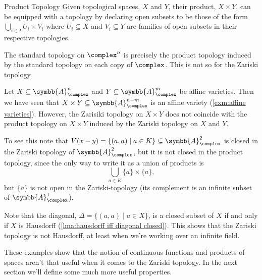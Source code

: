 \documentclass[fleqn]{NotesClass}
\newcommand{\affine}{\symbb{A}}
\begin{document}
    \begin{exm}{Product Topology}{}
        Given topological spaces, \(X\) and \(Y\), their product, \(X \times Y\), can be equipped with a topology by declaring open subsets to be those of the form \(\bigcup_{i \in I} U_i \times V_i\) where \(U_i \subseteq X\) and \(V_i \subseteq Y\) are families of open subsets in their respective topologies.
        
        The standard topology on \(\complex^n\) is precisely the product topology induced by the standard topology on each copy of \(\complex\).
        This is not so for the Zariski topology.
        
        Let \(X \subseteq \affine_{\complex}^n\) and \(Y \subseteq \affine_{\complex}^m\) be affine varieties.
        Then we have seen that \(X \times Y \subseteq \affine_{\complex}^{n+m}\) is an affine variety (\cref{exm:affine varieties}).
        However, the Zarisiki topology on \(X \times Y\) does not coincide with the product topology on \(X \times Y\) induced by the Zariski topology on \(X\) and \(Y\).
        
        To see this note that \(V(x - y) = \{(a, a) \mid a \in K\} \subseteq \affine_{\complex}^2\) is closed in the Zariski topology of \(\affine_{\complex}^2\), but it is not closed in the product topology, since the only way to write it as a union of products is
        \begin{equation}
            \bigcup_{a \in K} \{a\} \times \{a\},
        \end{equation}
        but \(\{a\}\) is not open in the Zariski-topology (its complement is an infinite subset of \(\affine_{\complex}^1\)).
    \end{exm}
    
    Note that the diagonal, \(\Delta = \{(a, a) \mid a \in X\}\), is a closed subset of \(X\) if and only if \(X\) is Hausdorff (\cref{lma:hausdorff iff diagonal closed}).
    This shows that the Zariski topology is not Hausdorff, at least when we're working over an infinite field.
    
    These examples show that the notion of continuous functions and products of spaces aren't that useful when it comes to the Zariski topology.
    In the next section we'll define some much more useful properties.
    
\end{document}

